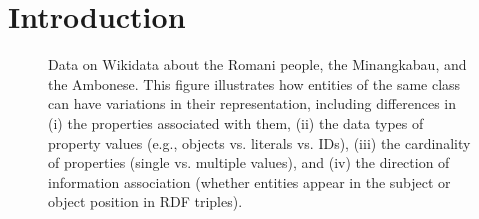 \section{Introduction}








\begin{figure}[!htbp]
    \centering
    \caption{Data on Wikidata about the Romani people, the Minangkabau, and the Ambonese. This figure illustrates how entities of the same class can have variations in their representation, including differences in (i) the properties associated with them, (ii) the data types of property values (e.g., objects vs. literals vs. IDs), (iii) the cardinality of properties (single vs. multiple values), and (iv) the direction of information association (whether entities appear in the subject or object position in RDF triples).} \label{fig:intro-wikidata}
\end{figure}

